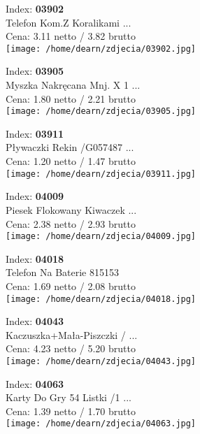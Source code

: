 {Index: \textbf{03902}\\
Telefon Kom.Z Koralikami  ...\\
Cena: 3.11 netto / 3.82 brutto\\
  \texttt{[image: /home/dearn/zdjecia/03902.jpg]}}\newline\newline

{Index: \textbf{03905}\\
Myszka Nakręcana Mnj. X 1 ...\\
Cena: 1.80 netto / 2.21 brutto\\
  \texttt{[image: /home/dearn/zdjecia/03905.jpg]}}\newline\newline

{Index: \textbf{03911}\\
Pływaczki Rekin  /G057487 ...\\
Cena: 1.20 netto / 1.47 brutto\\
  \texttt{[image: /home/dearn/zdjecia/03911.jpg]}}\newline\newline

{Index: \textbf{04009}\\
Piesek Flokowany Kiwaczek ...\\
Cena: 2.38 netto / 2.93 brutto\\
  \texttt{[image: /home/dearn/zdjecia/04009.jpg]}}\newline\newline

{Index: \textbf{04018}\\
Telefon Na Baterie 815153\\
Cena: 1.69 netto / 2.08 brutto\\
  \texttt{[image: /home/dearn/zdjecia/04018.jpg]}}\newline\newline

{Index: \textbf{04043}\\
Kaczuszka+Mała-Piszczki / ...\\
Cena: 4.23 netto / 5.20 brutto\\
  \texttt{[image: /home/dearn/zdjecia/04043.jpg]}}\newline\newline

{Index: \textbf{04063}\\
Karty Do Gry 54 Listki /1 ...\\
Cena: 1.39 netto / 1.70 brutto\\
  \texttt{[image: /home/dearn/zdjecia/04063.jpg]}}\newline\newline

